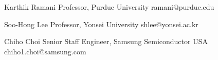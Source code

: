 


\begin{cvskills}


\cvskill
{Karthik Ramani} %
{Professor, Purdue University \hspace{21.5em} ramani@purdue.edu}

\cvskill
{Soo-Hong Lee} %
{Professor, Yonsei University \hspace{22em} shlee@yonsei.ac.kr}

\cvskill
{Chiho Choi} %
{Senior Staff Engineer, Samsung Semiconductor USA \hspace{12em} chiho1.choi@samsung.com}


\end{cvskills}
